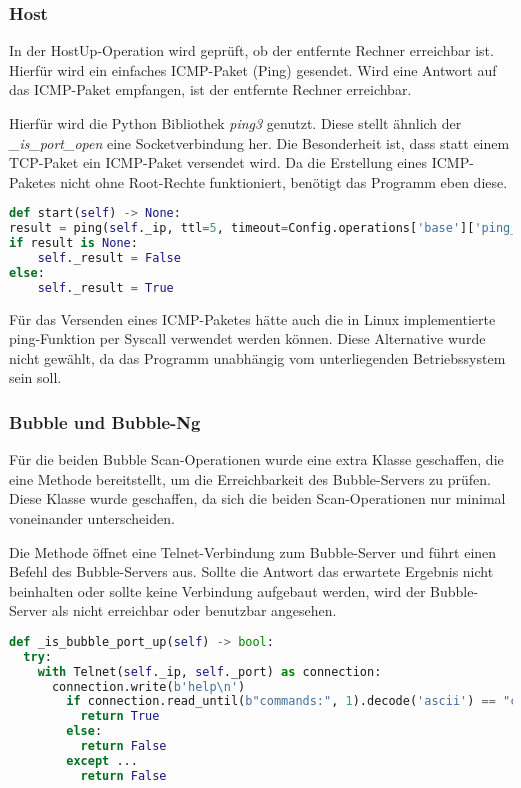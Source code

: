 \subsubsection{Host}
In der HostUp-Operation wird geprüft, ob der entfernte Rechner erreichbar ist. Hierfür wird ein einfaches ICMP-Paket (Ping) gesendet. Wird eine Antwort auf das ICMP-Paket empfangen, ist der entfernte Rechner erreichbar.

Hierfür wird die Python Bibliothek \textit{ping3} genutzt. Diese stellt ähnlich der \textit{\_is\_port\_open} eine Socketverbindung her. Die Besonderheit ist, dass statt einem TCP-Paket ein ICMP-Paket versendet wird. Da die Erstellung eines ICMP-Paketes nicht ohne Root-Rechte funktioniert, benötigt das Programm eben diese.

\begin{lstlisting}[language=Python, frame=single, caption={Big Brother HostUp Ping}, captionpos=b, label={lst:bigbrother-host-up}]
def start(self) -> None:
result = ping(self._ip, ttl=5, timeout=Config.operations['base']['ping_timeout'])
if result is None:
	self._result = False
else:
	self._result = True
\end{lstlisting}

Für das Versenden eines ICMP-Paketes hätte auch  die in Linux implementierte ping-Funktion per Syscall verwendet werden können. Diese Alternative wurde nicht gewählt, da das Programm unabhängig vom unterliegenden Betriebssystem sein soll.
 
\subsubsection{Bubble und Bubble-Ng}
Für die beiden Bubble Scan-Operationen wurde eine extra Klasse geschaffen, die eine Methode bereitstellt, um die Erreichbarkeit des Bubble-Servers zu prüfen. Diese Klasse wurde geschaffen, da sich die beiden Scan-Operationen nur minimal voneinander unterscheiden.

Die Methode öffnet eine Telnet-Verbindung zum Bubble-Server und führt einen Befehl des Bubble-Servers aus. Sollte die Antwort das erwartete Ergebnis nicht beinhalten oder sollte keine Verbindung aufgebaut werden, wird der Bubble-Server  als nicht erreichbar oder benutzbar angesehen.

\begin{lstlisting}[language=Python, frame=single, caption={Big Brother Buble Port Prüfung}, captionpos=b, label={lst:bigbrother-bubble-up}]
def _is_bubble_port_up(self) -> bool:
  try:
    with Telnet(self._ip, self._port) as connection:
      connection.write(b'help\n')
        if connection.read_until(b"commands:", 1).decode('ascii') == "commands:":
          return True
        else:
          return False
        except ...
          return False
\end{lstlisting} 

